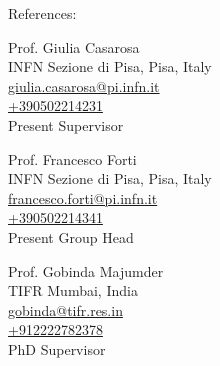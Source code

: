 \documentclass[10pt,stdletter,dateno,sigleft]{newlfm}
\begin{document}
\begin{newlfm}
  

  {\large References:}
  
  Prof. Giulia Casarosa \\
  INFN Sezione di Pisa, Pisa, Italy \\
  \href{mailto:giulia.casarosa@pi.infn.it}{giulia.casarosa@pi.infn.it} \\
  \href{tell:+390502214231}{+390502214231} \\
  Present Supervisor

  \vspace*{5pt}
  Prof. Francesco Forti \\
  INFN Sezione di Pisa, Pisa, Italy \\
  \href{mailto:francesco.forti@pi.infn.it}{francesco.forti@pi.infn.it} \\
  \href{tell:+390502214341}{+390502214341} \\
  Present Group Head

  \vspace*{5pt}
  Prof. Gobinda Majumder \\
  TIFR Mumbai, India \\
  \href{mailto:gobinda@tifr.res.in}{gobinda@tifr.res.in} \\
  \href{tell:+912222782378}{+912222782378} \\
  PhD Supervisor
  
\end{newlfm}
\end{document}
